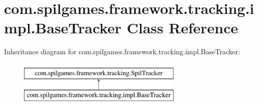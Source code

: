 \hypertarget{classcom_1_1spilgames_1_1framework_1_1tracking_1_1impl_1_1_base_tracker}{\section{com.\-spilgames.\-framework.\-tracking.\-impl.\-Base\-Tracker Class Reference}
\label{classcom_1_1spilgames_1_1framework_1_1tracking_1_1impl_1_1_base_tracker}
}
Inheritance diagram for com.\-spilgames.\-framework.\-tracking.\-impl.\-Base\-Tracker\-:\begin{figure}[H]
\begin{center}
\leavevmode
\includegraphics[height=2.000000cm]{classcom_1_1spilgames_1_1framework_1_1tracking_1_1impl_1_1_base_tracker}
\end{center}
\end{figure}
